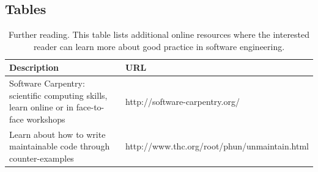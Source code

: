 \documentclass{bmcart}
\begin{document}
\begin{backmatter}
\section*{Tables}
\begin{table}[h!]
\caption{Further reading. This table lists additional online resources where the interested reader can learn more about good practice in software engineering.}
\label{tab:learnmore}
      \begin{tabular}{| p{5cm} | p{5cm} |}
        \hline
        Description & URL \\ \hline 
        Software Carpentry: scientific computing skills, learn online or in face-to-face workshops & http://software-carpentry.org/ \\
        Learn about how to write maintainable code through counter-examples & http://www.thc.org/root/phun/unmaintain.html \\ \hline
      \end{tabular}
\end{table}





\end{backmatter}
\end{document}
